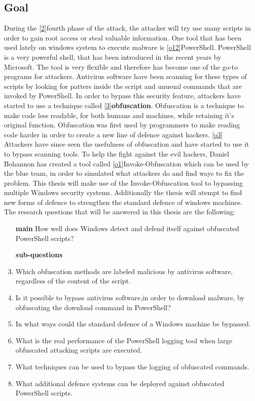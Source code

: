 \documentclass{article}%
\begin{document}
\subsection{Goal}
During the [\hyperlink{2}{2}]fourth phase of the attack, the attacker will try use many scripts in order to gain root access or steal valuable information. One tool that has been used lately on windows system to execute malware is [\hyperlink{o12}{o12}]PowerShell. PowerShell is a very powerful shell, that has been introduced in the recent years by Microsoft. The tool is very flexible and therefore has become one of the go-to programs for attackers. Antivirus software have been scanning for these types of scripts by looking for patters inside the script and unusual commands that are invoked by PowerShell. In order to bypass this security feature, attackers have started to use a technique called [\hyperlink{3}{3}]\textbf{obfuscation}. Obfuscation is a technique to make code less readable, for both humans and machines, while retaining it's original function. Obfuscation was first used by programmers to make reading code harder in order to create a new line of defence against hackers. [\hyperlink{o3}{o3}] Attackers have since seen the usefulness of obfuscation and have started to use it to bypass scanning tools. To help the fight against the evil hackers, Daniel Bohannon has created a tool called [\hyperlink{o1}{o1}]Invoke-Obfuscation which can be used by the blue team, in order to simulated what attackers do and find ways to fix the problem. This thesis will make use of the Invoke-Obfuscation tool to bypassing multiple Windows security systems. Additionally the thesis will atempt to find new forms of defence to strengthen the standard defence of windows machines.  The research questions that will be answered in this thesis are the following:
\begin{enumerate}
	\item[\textbf{main}]How well does Windows detect and defend itself against obfuscated PowerShell scripts?
	\item[\textbf{sub-questions}]
	\item Which obfuscation methods are labeled malicious by antivirus software, regardless of the content of the script.
	\item Is it possible to bypass antivirus software,in order to download malware, by obfuscating the download command in PowerShell?
	\item In what ways could the standard defence of a Windows machine be bypassed.
	\item What is the real performance of the PowerShell logging tool when large obfuscated attacking scripts are executed.
	\item What techniques can be used to bypass the logging of obfuscated commands.
	\item What additional defence systems can be deployed against obfuscated PowerShell scripts.
\end{enumerate}
\end{document}
